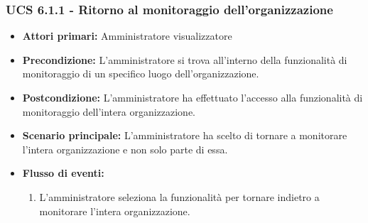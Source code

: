 \subsubsection{UCS 6.1.1 - Ritorno al monitoraggio dell'organizzazione}
\begin{itemize}
	\item \textbf{Attori primari:} Amministratore visualizzatore
	\item \textbf{Precondizione:} L'amministratore si trova all'interno della funzionalità di monitoraggio di un specifico luogo dell'organizzazione.
	\item \textbf{Postcondizione:} L'amministratore ha effettuato l'accesso alla funzionalità di monitoraggio dell'intera organizzazione.
	\item \textbf{Scenario principale:} L'amministratore ha scelto di tornare a monitorare l'intera organizzazione e non solo parte di essa.
	\item \textbf{Flusso di eventi:}
    \begin{enumerate}
        \item  L'amministratore seleziona la funzionalità per tornare indietro a monitorare l'intera organizzazione.
    \end{enumerate}
\end{itemize}


